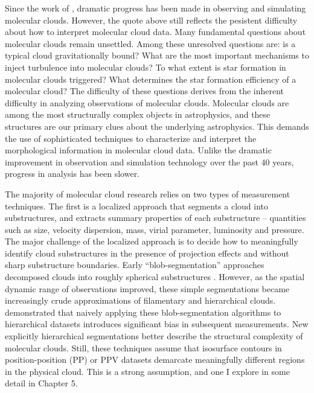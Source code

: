Since the work of \cite{Goldreich74}, dramatic progress has been made in observing and simulating molecular clouds. However, the quote above still reflects the pesistent difficulty about how to interpret molecular cloud data. Many fundamental questions about molecular clouds remain unsettled. Among these unresolved questions are: is a typical cloud gravitationally bound? What are the most important mechanisms to inject turbulence into molecular clouds? To what extent is star formation in molecular clouds triggered? What determines the star formation efficiency of a molecular cloud? The difficulty of these questions derives from the inherent difficulty in analyzing observations of molecular clouds. Molecular clouds are among the most structurally complex objects in astrophysics, and these structures are our primary clues about the underlying astrophysics. This demands the use of sophisticated techniques to characterize and interpret the morphological information in molecular cloud data. Unlike the dramatic improvement in observation and simulation technology over the past 40 years, progress in analysis has been slower.

The majority of molecular cloud research relies on two types of measurement techniques. The first is a localized approach that segments a cloud into substructures, and extracts summary properties of each substructure -- quantities such as size, velocity dispersion, mass, virial parameter, luminosity and pressure. The major challenge of the localized approach is to decide how to meaningfully identify cloud substructures in the presence of projection effects and without sharp substructure boundaries. Early ``blob-segmentation'' approaches decomposed clouds into roughly spherical substructures \citep{Stutzki90, Williams94}. However, as the spatial dynamic range of observations improved, these simple segmentations became increasingly crude approximations of filamentary and hierarchical clouds. \cite{Pineda09} demonstrated that naively applying these blob-segmentation algorithms to hierarchical datasets introduces significant bias in subsequent measurements. New explicitly hierarchical segmentations \citep{Rosolowsky08} better describe the structural complexity of molecular clouds. Still, these techniques assume that isosurface contours in position-position (PP) or PPV datasets demarcate meaningfully different regions in the physical cloud. This is a strong assumption, and one I explore in some detail in Chapter 5.

